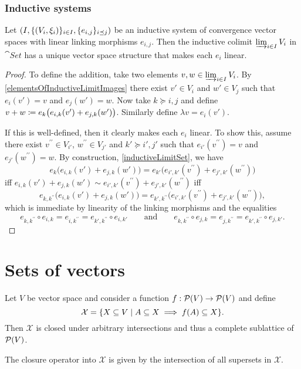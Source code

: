 \subsubsection{Inductive systems}
\begin{proposition} \label{vectorSpaceInductiveLimit}
Let $\sSet{I, \{\sSet{V_i, \xi_i}\}_{i\in I}, \{e_{i,j}\}_{i\preceq j}}$ be an inductive system of convergence vector spaces with linear linking morphisms $e_{i,j}$. Then the inductive colimit $\varinjlim_{i\in I} V_i$ in $\cat{Set}$ has a unique vector space structure that makes each $e_i$ linear.
\end{proposition}
\begin{proof}
To define the addition, take two elements $v,w\in \varinjlim_{i\in I} V_i$. By \ref{elementsOfInductiveLimitImages} there exist $v'\in V_i$ and $w'\in V_j$ such that $e_i(v') = v$ and $e_j(w') = w$. Now take $k \succeq i,j$ and define $v+w \coloneqq e_k\big(e_{i,k}(v') + e_{j,k}(w')\big)$. Similarly define $\lambda v = e_i(v')$.

If this is well-defined, then it clearly makes each $e_i$ linear. To show this, assume there exist $v^{\prime\prime}\in V_{i'}$, $w^{\prime\prime}\in V_{j'}$ and $k' \succeq i',j'$ such that $e_{i'}(v^{\prime\prime}) = v$ and $e_{j'}(w^{\prime\prime}) = w$. By construction, \ref{inductiveLimitSet}, we have
\[ e_k\big(e_{i,k}(v') + e_{j,k}(w')\big) = e_{k'}\big(e_{i',k'}(v^{\prime\prime}) + e_{j',k'}(w^{\prime\prime})\big) \]
iff $e_{i,k}(v') + e_{j,k}(w') \sim e_{i',k'}(v^{\prime\prime}) + e_{j',k'}(w^{\prime\prime})$ iff 
\[ e_{k,k^{\prime\prime}}\big(e_{i,k}(v') + e_{j,k}(w')\big) = e_{k',k^{\prime\prime}}\big(e_{i',k'}(v^{\prime\prime}) + e_{j',k'}(w^{\prime\prime})\big), \]
which is immediate by linearity of the linking morphisms and the equalities
\[ e_{k,k^{\prime\prime}} \circ e_{i,k} = e_{i,k^{\prime\prime}} = e_{k',k^{\prime\prime}} \circ e_{i,k'} \qquad\text{and}\qquad e_{k,k^{\prime\prime}} \circ e_{j,k} = e_{j,k^{\prime\prime}} = e_{k',k^{\prime\prime}} \circ e_{j,k'}. \]
\end{proof}

\section{Sets of vectors}
\begin{proposition} \label{latticesOfVectorSubsets}
Let $V$ be vector space and consider a function $f: \operatorname{\mathcal{P}}(V) \to \operatorname{\mathcal{P}}(V)$ and define
\[ \mathcal{X} = \setbuilder{X\subseteq V}{A \subseteq X \implies f(A)\subseteq X}. \]
Then $\mathcal{X}$ is closed under arbitrary intersections and thus a complete sublattice of $\operatorname{\mathcal{P}}(V)$.

The closure operator into $\mathcal{X}$ is given by the intersection of all supersets in $\mathcal{X}$.
\end{proposition}

